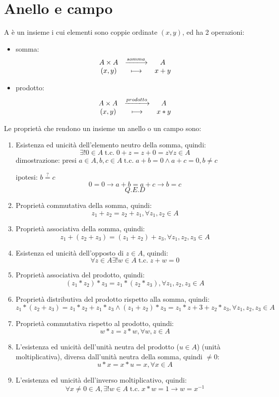 \documentclass[a4paper,12pt]{article}
\newcommand{\tc}{\;\text{t.c.}\;}
\begin{document}
	\section{Anello e campo}
	A è un insieme i cui elementi sono coppie ordinate $(x,y)$, ed ha 2 operazioni:
	\begin{itemize}
		\item somma: 
		\[
		\begin{array}{c c c}
			A \times A & \xlongrightarrow{somma} & A \\
			(x, y) & \longmapsto & x + y \\
		\end{array}
		\]
		\item prodotto:
		\[
		\begin{array}{c c c}
			A \times A & \xlongrightarrow{prodotto} & A \\
			(x, y) & \longmapsto & x * y \\
		\end{array}
		\]		
	\end{itemize}
	Le proprietà che rendono un insieme un anello o un campo sono:
	\begin{enumerate}
		\item Esistenza ed unicità dell'elemento neutro della somma, quindi:
		\[\exists! 0\in A \tc 0 + z = z + 0 = z \forall z\in A\]
		dimostrazione: presi $a \in A, b,c \in A \tc a + b = 0 \wedge a + c = 0, b \not = c$
		
		ipotesi: $b \stackrel{?}{=} c$
		\[0 = 0 \rightarrow a + b = a + c \rightarrow b = c\]
		\[Q.E.D\]
		\item Proprietà commutativa della somma, quindi: 
		\[z_1 + z_2 = z_2 + z_1, \forall z_1,z_2\in A\]
		\item Proprietà associativa della somma, quindi:
		\[z_1 + (z_2+z_3) = (z_1 + z_2) + z_3, \forall z_1,z_2,z_3\in A\]
		\item Esistenza ed unicità dell'opposto di $z \in A$, quindi:
		\[\forall z \in A \exists! w\in A \tc z + w = 0\]
		\item Proprietà associativa del prodotto, quindi:
		\[(z_1 * z_2) * z_3 = z_1 * (z_2 * z_3), \forall z_1,z_2,z_3\in A\]
		\item Proprietà distributiva del prodotto rispetto alla somma, quindi:
		\[z_1 * (z_2 + z_3) = z_1 * z_2 + z_1 * z_3 \wedge (z_1 + z_2) * z_3 = z_1 * z+3 + z_2 * z_3, \forall z_1,z_2,z_3\in A\]
		\item Proprietà commutativa rispetto al prodotto, quindi:
		\[w * z = z * w, \forall w,z \in A\]
		\item L'esistenza ed unicità dell'unità neutra del prodotto ($u \in A$) (unità moltiplicativa), diversa dall'unità neutra della somma, quindi $\not = 0$:
		\[u * x = x * u = x, \forall x \in A\]
		\item L'esistenza ed unicità dell'inverso moltiplicativo, quindi:
		\[\forall x\not = 0 \in A, \exists! w\in A \tc x * w = 1 \rightarrow w = x^{-1}\]
	\end{enumerate}
	
\end{document}
